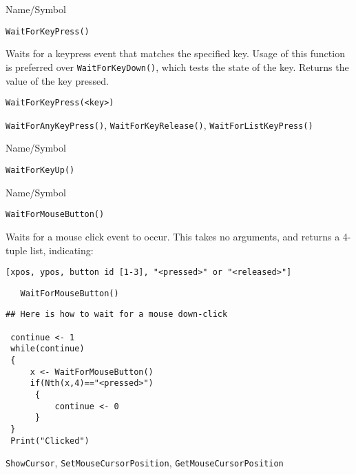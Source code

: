 \rl


\begin{desc}{Name/Symbol}
\item[Name/Symbol]  	\verb+WaitForKeyPress()+

\item[Description] Waits for a keypress event that matches the
  specified key.  Usage of this function is preferred over
  \verb+WaitForKeyDown()+, which tests the state of the key. Returns the
  value of the key pressed.

\item[Usage]
\begin{verbatim}
WaitForKeyPress(<key>)
\end{verbatim}

\item[Example]	

\item[See Also]     	\verb+WaitForAnyKeyPress()+, \verb+WaitForKeyRelease()+, \verb+WaitForListKeyPress()+
\end{desc}

\rl


\begin{desc}{Name/Symbol}
\item[Name/Symbol] 	\verb+WaitForKeyUp()+

\item[Description]	

\item[Usage]		

\item[Example]	

\item[See Also]	
\end{desc}


\rl
\begin{desc}{Name/Symbol}
\item[Name/Symbol]	\verb+WaitForMouseButton()+

\item[Description] Waits for a mouse click event to occur.
  This takes no arguments, and returns a 4-tuple list, indicating:

  \verb+[xpos, ypos, button id [1-3], "<pressed>" or "<released>"]+

\item[Usage]
\begin{verbatim}
   WaitForMouseButton()
\end{verbatim}

\item[Example]	
\begin{verbatim}
## Here is how to wait for a mouse down-click

 continue <- 1
 while(continue)
 {
     x <- WaitForMouseButton()
     if(Nth(x,4)=="<pressed>")
      {
          continue <- 0
      }
 }
 Print("Clicked")
\end{verbatim}


\item[See Also]
  \verb+ShowCursor+,
  \verb+SetMouseCursorPosition+, \verb+GetMouseCursorPosition+
\end{desc}

